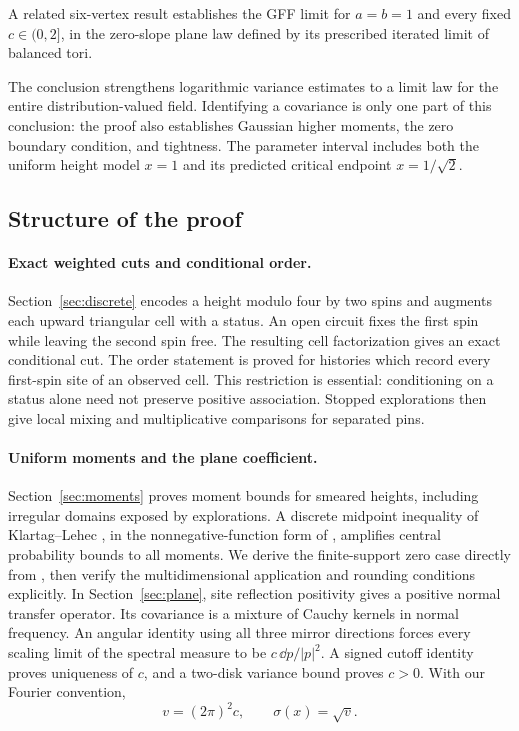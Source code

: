 A related six-vertex result \cite[Theorem~1.1]{BalancedSixVertexGFF2026}
establishes the GFF limit for $a=b=1$ and every fixed $c\in(0,2]$, in the
zero-slope plane law defined by its prescribed iterated limit of balanced tori.

The conclusion strengthens logarithmic variance estimates to a limit
law for the entire distribution-valued field.  Identifying a covariance
is only one part of this conclusion: the proof also establishes Gaussian
higher moments, the zero boundary condition, and tightness.  The parameter
interval includes both the uniform height model $x=1$ and its predicted
critical endpoint $x=1/\sqrt2$.

\subsection{Structure of the proof}

\paragraph{Exact weighted cuts and conditional order.}
Section~\ref{sec:discrete} encodes a height modulo four by two spins and
augments each upward triangular cell with a status.  An open circuit fixes
the first spin while leaving the second spin free.  The resulting cell
factorization gives an exact conditional cut.  The order statement is
proved for histories which record every first-spin site of an observed
cell.  This restriction is essential: conditioning on a status alone need
not preserve positive association.  Stopped explorations then give local
mixing and multiplicative comparisons for separated pins.

\paragraph{Uniform moments and the plane coefficient.}
Section~\ref{sec:moments} proves moment bounds for smeared heights,
including irregular domains exposed by explorations.  A discrete midpoint
inequality of Klartag--Lehec \cite[Theorem~1.4]{KlartagLehec2019}, in the
nonnegative-function form of \cite[Theorem~3]{GRST2019}, amplifies central
probability bounds to all moments.  We derive the finite-support zero
case directly from \cite[Theorem~8]{GRST2019}, then verify the
multidimensional application and rounding conditions explicitly.
In Section~\ref{sec:plane},
site reflection positivity gives a positive normal transfer operator.
Its covariance is a mixture of Cauchy kernels in normal frequency.
An angular identity using all three mirror directions forces every
scaling limit of the spectral measure to be $c\,\dd p/|p|^2$.
A signed cutoff identity proves uniqueness of $c$, and a two-disk variance
bound proves $c>0$.  With our Fourier convention,
\begin{equation}\label{eq:normalization}
 v=(2\pi)^2c,\qquad \sigma(x)=\sqrt v.
\end{equation}

